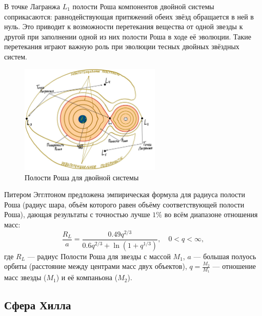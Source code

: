 \documentclass[a4paper,12pt]{article}
\begin{document}
В точке Лагранжа $L_1$ полости Роша компонентов двойной системы соприкасаются: равнодействующая притяжений обеих звёзд обращается в ней в нуль.
Это приводит к возможности перетекания вещества от одной звезды к другой при заполнении одной из них полости Роша в ходе её эволюции.
Такие перетекания играют важную роль при эволюции тесных двойных звёздных систем.
\begin{figure}[H]
    \begin{center}
	\includegraphics[width=0.6\textwidth]{roche.jpg}
	\caption{Полости Роша для двойной системы}
    \end{center}
\end{figure}
Питером Эгглтоном предложена эмпирическая формула для радиуса полости Роша (радиус шара, объём которого равен объёму соответствующей полости Роша),
дающая результаты с точностью лучше $1\%$ во всём диапазоне отношения масс:
$$ \frac{R_{L}}{a} = \frac {0.49 q^{2/3}}{0.6 q^{2/3} + \ln{(1+q^{1/3})}},\quad 0 < q < \infty, $$
где 
$ R_{L} $ — радиус Полости Роша для звезды с массой $M_1$, 
$  a    $ — большая полуось орбиты (расстояние между центрами масс двух объектов),
$ q = \frac{M_{2}}{M_{1}} $ —  отношение масс звезды ($M_1$) и её компаньона ($M_2$).

\subsection{Сфера Хилла}
\end{document}
